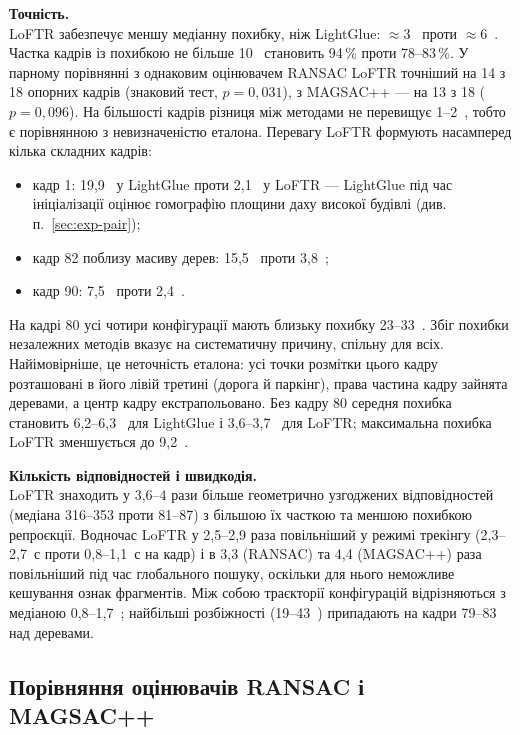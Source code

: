\textbf{Точність.}\\
LoFTR забезпечує меншу медіанну похибку, ніж LightGlue: $\approx 3$~\px{} проти $\approx 6$~\px{}. Частка кадрів із похибкою не більше 10~\px{} становить 94\,\% проти 78--83\,\%. У парному порівнянні з однаковим оцінювачем RANSAC LoFTR точніший на 14 з 18 опорних кадрів (знаковий тест, $p = 0{,}031$), з MAGSAC++ --- на 13 з 18 ($p = 0{,}096$). На більшості кадрів різниця між методами не перевищує 1--2~\px{}, тобто є порівнянною з невизначеністю еталона. Перевагу LoFTR формують насамперед кілька складних кадрів:
\begin{itemize}
    \item кадр 1: 19,9~\px{} у LightGlue проти 2,1~\px{} у LoFTR --- LightGlue під час ініціалізації оцінює гомографію площини даху високої будівлі (див. п.~\ref{sec:exp-pair});
    \item кадр 82 поблизу масиву дерев: 15,5~\px{} проти 3,8~\px{};
    \item кадр 90: 7,5~\px{} проти 2,4~\px{}.
\end{itemize}

На кадрі 80 усі чотири конфігурації мають близьку похибку 23--33~\px{}. Збіг похибки незалежних методів вказує на систематичну причину, спільну для всіх. Найімовірніше, це неточність еталона: усі точки розмітки цього кадру розташовані в його лівій третині (дорога й паркінг), права частина кадру зайнята деревами, а центр кадру екстрапольовано. Без кадру 80 середня похибка становить 6,2--6,3~\px{} для LightGlue і 3,6--3,7~\px{} для LoFTR; максимальна похибка LoFTR зменшується до 9,2~\px{}.

\textbf{Кількість відповідностей і швидкодія.}\\
LoFTR знаходить у 3,6--4 рази більше геометрично узгоджених відповідностей (медіана 316--353 проти 81--87) з більшою їх часткою та меншою похибкою репроєкції. Водночас LoFTR у 2,5--2,9 раза повільніший у режимі трекінгу (2,3--2,7~с проти 0,8--1,1~с на кадр) і в 3,3 (RANSAC) та 4,4 (MAGSAC++) раза повільніший під час глобального пошуку, оскільки для нього неможливе кешування ознак фрагментів. Між собою траєкторії конфігурацій відрізняються з медіаною 0,8--1,7~\px{}; найбільші розбіжності (19--43~\px{}) припадають на кадри 79--83 над деревами.

\subsection{Порівняння оцінювачів RANSAC і MAGSAC++}

